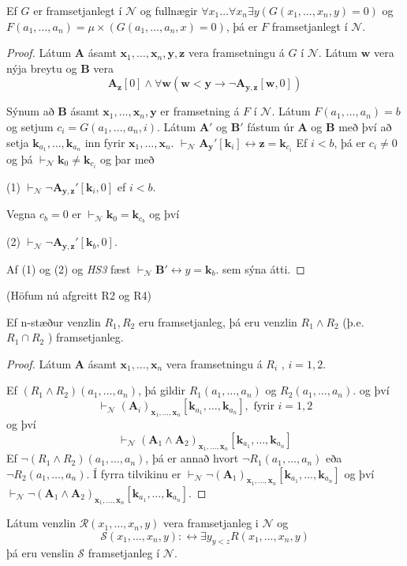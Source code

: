 \documentclass[12pt]{book}
\newcommand{\cS}{\mathcal{S}}
\newcommand{\cN}{\mathcal{N}}
\newcommand{\cR}{\mathcal{R}}
\newcommand{\bA}{\mathbf{A}}
\newcommand{\bB}{\mathbf{B}}
\newcommand{\bx}{\mathbf{x}}
\newcommand{\bk}{\mathbf{k}}
\newcommand{\by}{\mathbf{y}}
\newcommand{\bz}{\mathbf{z}}
\newcommand{\bw}{\mathbf{w}}
\newcommand{\xxn}{x_1, \dotsc, x_n}
\newcommand{\bxxn}{\bx_1, \dotsc, \bx_n}
\newcommand{\aan}{a_1, \dotsc, a_n}
\newcommand{\bkaan}{\bk_{a_1}, \dotsc,\bk_{a_n}}
\newcommand{\vN}{\vdash_{\cN}}
\begin{document}
\begin{setn}[HS4]
 Ef $G$ er framsetjanlegt í $\cN$ og fullnægir $\forall x_1 \dotsc \forall x_n \exists y ( G(\xxn,y) = 0)$
 og $F(\aan) = \mu \times (G(\aan,x) = 0)$, þá er $F$ framsetjanlegt í $\cN$.
 \begin{proof}
   Látum $\bA$ ásamt $\bxxn, \by, \bz$ vera framsetningu á $G$ í $\cN$. 
   Látum $\bw$ vera nýja breytu og $\bB$ vera 
   \[ \bA_{\bz}[0] \wedge \forall \bw ( \bw < \by \to \lnot \bA_{\by, \bz}[\bw,0])\]

   Sýnum að $\bB$ ásamt $\bxxn, \by$ er framsetning á $F$ í $\cN$.
   Látum $F(\aan)  = b$ og setjum $c_i = G(\aan, i)$.
   Látum $\bA'$ og $\bB'$ fástum úr $\bA$ og $\bB$ með því að setja $\bkaan$ inn
   fyrir $\bxxn$. $\vN \bA_{\by}' [\bk_i] \leftrightarrow \bz = \bk_{c_i}$
   Ef $i < b$, þá er $c_i \neq 0$ og þá $\vN \bk_0 \neq \bk_{c_i}$ og þar með
   
   (1) $\vN \lnot \bA_{\by,\bz}'[\bk_i,0]$ ef $i < b$.

   Vegna $c_b = 0$ er $\vN \bk_0 = \bk_{c_b}$ og því

   (2) $\vN \lnot \bA_{\by,\bz}'[\bk_b,0]$.

   Af (1) og (2) og \emph{HS3} fæst
   $\vN \bB' \leftrightarrow y = \bk_b$.
   sem sýna átti.
 \end{proof}
\end{setn}

(Höfum nú afgreitt R2 og R4)
\begin{setn}[HS5]
  Ef n-stæður venzlin $R_1, R_2$ eru framsetjanleg, þá eru venzlin $R_1 \wedge R_2$ (þ.e. $R_1 \cap R_2$ ) framsetjanleg.
  \begin{proof}
    Látum $\bA$ ásamt $\bxxn$ vera framsetningu á $R_i$ , $i = 1,2$. 

    Ef $(R_1 \wedge R_2)(\aan)$, þá gildir $R_1(\aan)$ og $R_2(\aan)$. og því
   \[ \vN (\bA_i)_{\bxxn}[\bkaan], \text{ fyrir } i = 1,2\]
   og því
   \[ \vN (\bA_1 \wedge \bA_2)_{\bxxn}[\bkaan]\]
   Ef $\lnot (R_1 \wedge R_2)(\aan)$, þá er annað hvort $\lnot R_1(\aan)$ eða $\lnot R_2(\aan)$. Í fyrra
   tilvikinu er $\vN \lnot (\bA_1)_{\bxxn}[\bkaan]$ og því $\vN \lnot (\bA_1 \wedge \bA_2)_{\bxxn}[\bkaan]$.
  \end{proof}
\end{setn}




\begin{setn}[HS6]
  Látum venzlin $\cR(\xxn,y)$ vera framsetjanleg i $\cN$ og
  \[\cS(\xxn,y): \leftrightarrow \exists y_{y < z} R(\xxn, y)\]
  þá eru venslin $\cS$ framsetjanleg í $\cN$.
\end{setn}
\end{document}
